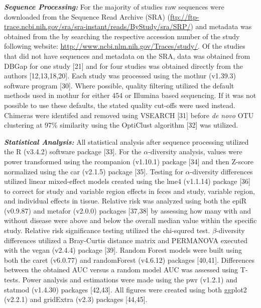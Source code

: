 \documentclass[12pt,]{article}
\begin{document}
\textbf{\emph{Sequence Processing:}} For the majority of studies raw
sequences were downloaded from the Sequence Read Archive (SRA)
(\url{ftp://ftp-trace.ncbi.nih.gov/sra/sra-instant/reads/ByStudy/sra/SRP/})
and metadata was obtained from the by searching the respective accession
number of the study following website:
\url{http://www.ncbi.nlm.nih.gov/Traces/study/}. Of the studies that did
not have sequences and metadata on the SRA, data was obtained from DBGap
for one study {[}21{]} and for four studies was obtained directly from
the authors {[}12,13,18,20{]}. Each study was processed using the mothur
(v1.39.3) software program {[}30{]}. Where possible, quality filtering
utilized the default methods used in mothur for either 454 or Illumina
based sequencing. If it was not possible to use these defaults, the
stated quality cut-offs were used instead. Chimeras were identifed and
removed using VSEARCH {[}31{]} before \emph{de novo} OTU clustering at
97\% similarity using the OptiClust algorithm {[}32{]} was utilized.

\textbf{\emph{Statistical Analysis:}} All statistical analysis after
sequence processing utilized the R (v3.4.2) software package {[}33{]}.
For the \(\alpha\)-diversity analysis, values were power transformed
using the rcompanion (v1.10.1) package {[}34{]} and then Z-score
normalized using the car (v2.1.5) package {[}35{]}. Testing for
\(\alpha\)-diversity differences utilized linear mixed-effect models
created using the lme4 (v1.1.14) package {[}36{]} to correct for study
and variable region effects in feces and study, variable region, and
individual effects in tissue. Relative risk was analyzed using both the
epiR (v0.9.87) and metafor (v2.0.0) packages {[}37,38{]} by assessing
how many with and without disease were above and below the overall
median value within the specific study. Relative risk significance
testing utilized the chi-squred test. \(\beta\)-diversity differences
utilized a Bray-Curtis distance matrix and PERMANOVA executed with the
vegan (v2.4.4) package {[}39{]}. Random Forest models were built using
both the caret (v6.0.77) and randomForest (v4.6.12) packages
{[}40,41{]}. Differences between the obtained AUC versus a random model
AUC was assessed using T-tests. Power analysis and estimations were made
using the pwr (v1.2.1) and statmod (v1.4.30) packages {[}42,43{]}. All
figures were created using both ggplot2 (v2.2.1) and gridExtra (v2.3)
packages {[}44,45{]}.
\end{document}
